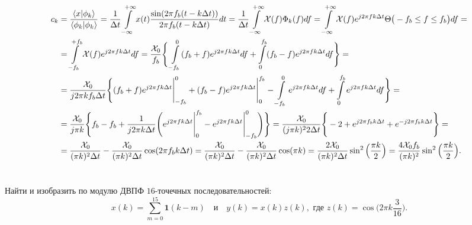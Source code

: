 \begin{align*}
	c_k &= \dfrac{\braket{x|\phi_k}}{\braket{\phi_k|\phi_k}} = \dfrac{1}{\Delta t} \int\limits_{-\infty}^{+\infty}x(t)\dfrac{\sin(2\pi f_b(t - k \Delta t))}{2\pi f_b(t - k \Delta t)}dt =
	\dfrac{1}{\Delta t} \int\limits_{-\infty}^{+\infty}\mathcal{X}(f)\Phi_k(f)df = \int\limits_{-\infty}^{+\infty}\mathcal{X}(f) e^{j 2\pi f k \Delta t} \Theta \big(-f_b \leq  f \leq f_{b}\big) df =\\
	&=\int\limits_{-f_b}^{+f_b}\mathcal{X}(f) e^{j 2\pi f k \Delta t}df = \dfrac{\mathcal{X}_0}{f_b}\Bigg\{\int\limits_{-f_b}^{0} (f_b + f) e^{j 2\pi f k \Delta t}df + \int\limits_{0}^{f_b} (f_b - f) e^{j 2\pi f k \Delta t}df\Bigg\} =\\
	&=\dfrac{\mathcal{X}_0}{j2\pi k f_b \Delta t}\Bigg\{(f_b + f)e^{j 2\pi f k \Delta t}\Bigg|_{-f_b}^0 + (f_b - f)e^{j 2\pi f k \Delta t}\Bigg|_{0}^{f_b}
	- \int\limits_{-f_b}^{0} e^{j 2\pi f k \Delta t}df + \int\limits_{0}^{f_b} e^{j 2\pi f k \Delta t}df\Bigg\} = \\
	&=\dfrac{\mathcal{X}_0}{j\pi k}\Bigg\{f_b - f_b + \dfrac{1}{j 2\pi k \Delta t} \Bigg(e^{j 2\pi f k \Delta t}\Bigg|_{0}^{f_b} - e^{j 2\pi f k \Delta t}\Bigg|_{-f_b}^{0} \Bigg) \Bigg\} =
	\dfrac{\mathcal{X}_0}{(j\pi k)^2 2\Delta t}\Bigg\{-2 + e^{j 2\pi f_b k \Delta t} + e^{-j 2\pi f_b k \Delta t} \Bigg \} = \\
	&= \dfrac{\mathcal{X}_0}{(\pi k)^2 \Delta t} - \dfrac{\mathcal{X}_0}{(\pi k)^2 \Delta t}\cos(2\pi f_b k \Delta t) = \dfrac{\mathcal{X}_0}{(\pi k)^2 \Delta t} - \dfrac{\mathcal{X}_0}{(\pi k)^2 \Delta t}\cos(\pi k) = \dfrac{2\mathcal{X}_0}{(\pi k)^2 \Delta t}\sin^2 \Big(\frac{\pi k}{2}\Big) = \dfrac{4 \mathcal{X}_0 f_b}{(\pi k)^2}\sin^2 \Big(\frac{\pi k}{2}\Big).
\end{align*}

\section{}
Найти и изобразить по модулю ДВПФ $16$-точечных последовательностей:
\begin{equation*}
	x(k) = \sum \limits_{m=0}^{15}\mathbf{1}(k-m) \quad \text{и}\quad y(k) = x(k)z(k),\text{ где }z(k) = \cos\Big(2 \pi k \frac{3}{16}\Big).
\end{equation*}

